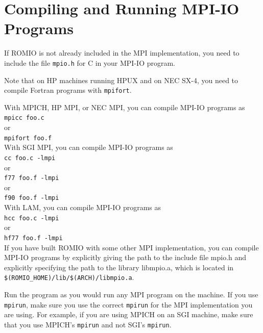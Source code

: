 %
%
\section{Compiling and Running MPI-IO Programs}
If ROMIO is not already included in the MPI implementation, you need
to include the file {\tt mpio.h} for C in your MPI-IO program.  

Note that on HP machines running HPUX and on NEC SX-4, you need to
compile Fortran programs with {\tt mpifort}.

With MPICH, HP MPI, or NEC MPI, you can compile MPI-IO programs as \\
\hspace*{.4in} {\tt mpicc foo.c}\\
or \\
\hspace*{.4in} {\tt mpifort foo.f}\\

With SGI MPI, you can compile MPI-IO programs as \\
\hspace*{.4in} {\tt cc foo.c -lmpi}\\
or \\
\hspace*{.4in} {\tt f77 foo.f -lmpi}\\
or \\
\hspace*{.4in} {\tt f90 foo.f -lmpi}\\

With LAM, you can compile MPI-IO programs as \\
\hspace*{.4in} {\tt hcc foo.c -lmpi}\\
or \\
\hspace*{.4in} {\tt hf77 foo.f -lmpi}\\

If you have built ROMIO with some other MPI implementation, you can
compile MPI-IO programs by explicitly giving the path to the include
file mpio.h and explicitly specifying the path to the
library libmpio.a, which is located in {\tt \$(ROMIO\_HOME)/lib/\$(ARCH)/libmpio.a}.

Run the program as you would run any MPI program on the machine.
If you use {\tt mpirun}, make sure you use the correct {\tt mpirun}
for the MPI implementation you are using. For example, if you
are using MPICH on an SGI machine, make sure that you use MPICH's
{\tt mpirun} and not SGI's {\tt mpirun}.


